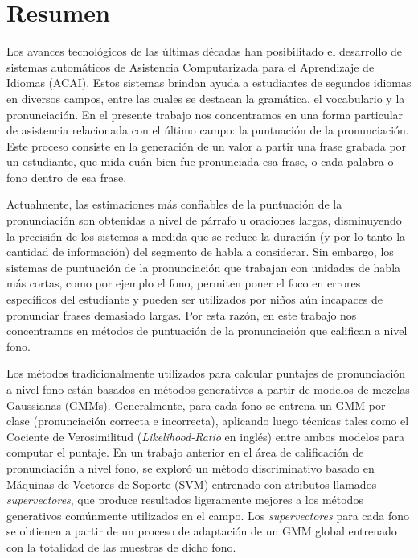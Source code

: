 \chapter*{Resumen}

Los avances tecnológicos de las últimas décadas han
posibilitado el desarrollo de sistemas
automáticos de Asistencia Computarizada para el Aprendizaje de Idiomas (ACAI).
Estos sistemas brindan ayuda a estudiantes de segundos idiomas
en diversos campos, entre las cuales se destacan la gramática, el vocabulario
y la pronunciación. En el presente trabajo nos concentramos en una forma
particular de asistencia relacionada con el último campo: la puntuación
de la pronunciación. Este proceso consiste en la generación de un valor
a partir una frase grabada por un estudiante, que mida cuán bien
fue pronunciada esa frase,
o cada palabra o fono dentro de esa frase.

Actualmente, las estimaciones más confiables de la puntuación de la pronunciación
son obtenidas a nivel de párrafo u oraciones largas, disminuyendo la precisión
de los sistemas a medida que se reduce la duración
(y por lo tanto la cantidad de información) del segmento de habla a considerar.
Sin embargo, los sistemas de puntuación de la pronunciación
que trabajan con unidades de habla
más cortas, como por ejemplo el fono,
permiten poner el foco en errores específicos del estudiante y
pueden ser utilizados por niños aún incapaces de pronunciar frases
demasiado largas. Por esta razón,
en este trabajo nos concentramos en métodos de puntuación de la pronunciación
que califican a nivel fono.

Los métodos tradicionalmente utilizados para calcular
puntajes de pronunciación a nivel fono
están basados en métodos generativos a partir de
modelos de mezclas Gaussianas (GMMs). Generalmente,
para cada fono se
entrena un GMM por clase (pronunciación correcta e incorrecta),
aplicando luego técnicas tales como el Cociente de
Verosimilitud (\textit{Likelihood-Ratio} en inglés) entre ambos modelos para
computar el puntaje. En un trabajo anterior en
el área de calificación de pronunciación a nivel fono,
se exploró
un método discriminativo basado en Máquinas de Vectores de Soporte (SVM) entrenado
con atributos llamados \textit{supervectores}, que produce resultados
ligeramente mejores a los métodos generativos comúnmente utilizados en el campo.
Los \textit{supervectores} para cada fono se obtienen
a partir de un proceso de adaptación de un
GMM global entrenado con la totalidad
de las muestras de dicho fono.

